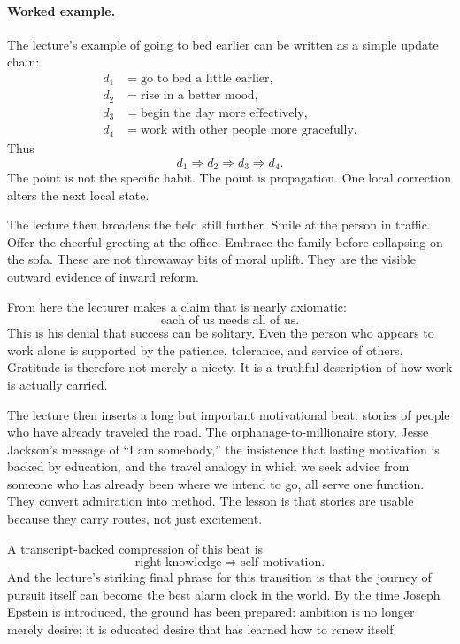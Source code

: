 \paragraph{Worked example.} The lecture's example of going to bed earlier can be written as a simple update chain:
\begin{align}
d_1 &= \text{go to bed a little earlier},\\
d_2 &= \text{rise in a better mood},\\
d_3 &= \text{begin the day more effectively},\\
d_4 &= \text{work with other people more gracefully}.
\end{align}
Thus
\begin{equation}
d_1 \Rightarrow d_2 \Rightarrow d_3 \Rightarrow d_4.
\end{equation}
The point is not the specific habit. The point is propagation. One local correction alters the next local state.

The lecture then broadens the field still further. Smile at the person in traffic. Offer the cheerful greeting at the office. Embrace the family before collapsing on the sofa. These are not throwaway bits of moral uplift. They are the visible outward evidence of inward reform.

From here the lecturer makes a claim that is nearly axiomatic:
\begin{equation}
\text{each of us needs all of us}.
\end{equation}
This is his denial that success can be solitary. Even the person who appears to work alone is supported by the patience, tolerance, and service of others. Gratitude is therefore not merely a nicety. It is a truthful description of how work is actually carried.

The lecture then inserts a long but important motivational beat: stories of people who have already traveled the road. The orphanage-to-millionaire story, Jesse Jackson's message of ``I am somebody,'' the insistence that lasting motivation is backed by education, and the travel analogy in which we seek advice from someone who has already been where we intend to go, all serve one function. They convert admiration into method. The lesson is that stories are usable because they carry routes, not just excitement.

A transcript-backed compression of this beat is
\begin{equation}
\text{right knowledge} \Rightarrow \text{self-motivation}.
\end{equation}
And the lecture's striking final phrase for this transition is that the journey of pursuit itself can become the best alarm clock in the world. By the time Joseph Epstein is introduced, the ground has been prepared: ambition is no longer merely desire; it is educated desire that has learned how to renew itself.

